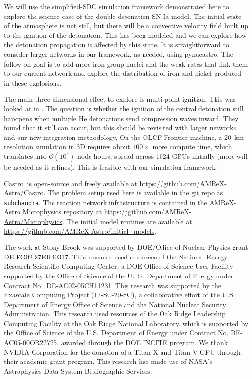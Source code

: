\documentclass[preprint,linenumbers]{aastex631}
\newcommand{\castro}{{\sf Castro}}
\newcommand{\pynucastro}{{\sf pynucastro}}
\begin{document}
We will use the simplified-SDC simulation framework demonstrated here to explore the science case of the double detonation SN Ia model.    The initial state of the atmosphere is not still, but there will be a convective velocity field built up to the ignition of the detonation.  This has been modeled \citep{jacobs:2016,glasner:2018} and we can explore how the detonation propagation is affected by this state.  It is straightforward to consider larger
networks in our framework, as needed, using \pynucastro.  The follow-on goal is to add more iron-group nuclei and the weak rates that link them to our current network and explore the distribution of iron and nickel produced in these explosions.

The main three-dimensional effect to explore is multi-point ignition.  This was looked at in \citet{mollwoosley:2013}.  The question is whether the ignition of the central detonation still hapopens when multiple He detonations send compression waves inward.  They found that it still can occur, but this should be revisited with larger networks and our new integration methodology.  On the OLCF Frontier machine, a 20~km resolution simulation in 3D requires about $100\times$ more compute time, which translates into $\mathcal{O}(10^4)$ node hours, spread across 1024 GPUs initially (more will be needed as it refines).  This is feasible with our simulation framework.


\begin{acknowledgements}
\castro\ is open-source and freely available at
\url{https://github.com/AMReX-Astro/Castro}.  The problem setup used
here is available in the git repo as {\tt subchandra}.  The reaction network infrastructure
is contained in the AMReX-Astro Microphysics repository at \url{https://github.com/AMReX-Astro/Microphysics}.  The initial model routines
are available at \url{https://github.com/AMReX-Astro/initial_models}.

The work at Stony Brook was supported by DOE/Office of Nuclear
Physics grant DE-FG02-87ER40317.  This research used resources of the
National Energy Research Scientific Computing Center, a DOE Office of
Science User Facility supported by the Office of Science of the
U.~S.\ Department of Energy under Contract No.\ DE-AC02-05CH11231.
This research was supported by the Exascale Computing Project
(17-SC-20-SC), a collaborative effort of the U.S. Department of Energy
Office of Science and the National Nuclear Security Administration.
This research used resources of the Oak Ridge Leadership Computing
Facility at the Oak Ridge National Laboratory, which is supported by
the Office of Science of the U.S. Department of Energy under Contract
No. DE-AC05-00OR22725, awarded through the DOE INCITE program.  We
thank NVIDIA Corporation for the donation of a Titan X and Titan V GPU
through their academic grant program.  This research has made use of
NASA's Astrophysics Data System Bibliographic Services.
\end{acknowledgements}
\end{document}
